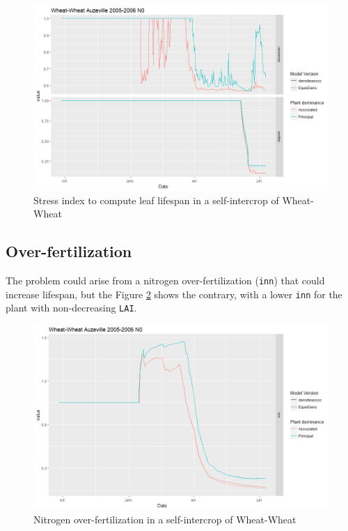 \documentclass[
]{book}
\begin{document}
\begin{figure}
\centering
\includegraphics{img/sen_stress.png}
\caption{\label{fig:senstress}Stress index to compute leaf lifespan in a self-intercrop of Wheat-Wheat}
\end{figure}

\hypertarget{over-fertilization}{%
\subsection{Over-fertilization}\label{over-fertilization}}

The problem could arise from a nitrogen over-fertilization (\texttt{inn}) that could increase lifespan, but the Figure \ref{fig:overfert} shows the contrary, with a lower \texttt{inn} for the plant with non-decreasing \texttt{LAI}.

\begin{figure}
\centering
\includegraphics{img/overfert.png}
\caption{\label{fig:overfert}Nitrogen over-fertilization in a self-intercrop of Wheat-Wheat}
\end{figure}
\end{document}
